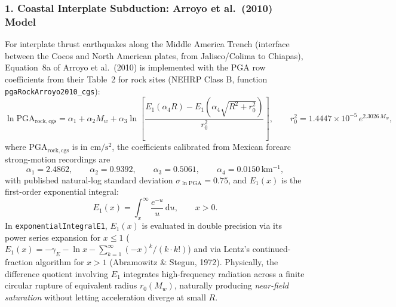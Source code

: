 \documentclass[11pt,a4paper]{article}
\newcommand{\dd}{\mathrm d}
\newcommand{\unit}[1]{\mathrm{#1}}
\begin{document}
\subsubsection*{1. Coastal Interplate Subduction: Arroyo et al.\ (2010) Model}
For interplate thrust earthquakes along the Middle America Trench (interface between the Cocos and North American
plates, from Jalisco/Colima to Chiapas), Equation~8a of Arroyo et al.\ (2010) is implemented with the
$\mathrm{PGA}$ row coefficients from their Table~2 for rock sites (NEHRP Class B, function
\texttt{pgaRockArroyo2010\_cgs}):
\begin{equation}
  \ln\mathrm{PGA}_{\mathrm{rock,cgs}}
  = \alpha_1 + \alpha_2 M_w + \alpha_3\ln\!\left[
    \frac{E_1(\alpha_4 R) - E_1\!\left(\alpha_4\sqrt{R^2 + r_0^2}\right)}{r_0^2}
  \right],
  \qquad
  r_0^2 = 1.4447\times 10^{-5}\,e^{2.3026\,M_w},
  \label{eq:gmpe-arroyo}
\end{equation}
where $\mathrm{PGA}_{\mathrm{rock,cgs}}$ is in $\unit{cm/s^2}$, the coefficients calibrated from Mexican forearc
strong-motion recordings are
\[
  \alpha_1 = 2.4862,\qquad
  \alpha_2 = 0.9392,\qquad
  \alpha_3 = 0.5061,\qquad
  \alpha_4 = 0.0150\,\unit{km^{-1}},
\]
with published natural-log standard deviation $\sigma_{\ln\mathrm{PGA}} = 0.75$, and $E_1(x)$ is the first-order
exponential integral:
\begin{equation}
  E_1(x) = \int_x^\infty \frac{e^{-u}}{u}\,\dd u, \qquad x > 0.
  \label{eq:integral-exponencial}
\end{equation}
In \texttt{exponentialIntegralE1}, $E_1(x)$ is evaluated in double precision via its power series expansion for
$x\le 1$ ($E_1(x) = -\gamma_E - \ln x - \sum_{k=1}^\infty (-x)^k/(k\cdot k!)$) and via Lentz's continued-fraction
algorithm for $x>1$ (Abramowitz \& Stegun, 1972). Physically, the difference quotient involving $E_1$ integrates
high-frequency radiation across a finite circular rupture of equivalent radius $r_0(M_w)$, naturally producing
\emph{near-field saturation} without letting acceleration diverge at small $R$.
\end{document}
